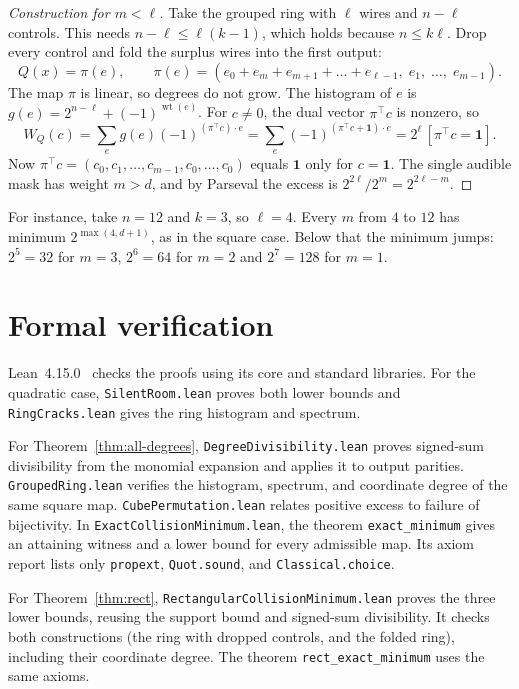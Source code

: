 \documentclass[11pt]{article}
\theoremstyle{definition}
\theoremstyle{remark}
\newcommand{\wt}{\operatorname{wt}}
\newcommand{\W}{W}
\newcommand{\one}{\mathbf{1}}
\begin{document}
\begin{proof}[Construction for $m<\ell$]
Take the grouped ring with $\ell$ wires and $n-\ell$ controls. This needs
$n-\ell\le\ell(k-1)$, which holds because $n\le k\ell$. Drop every control
and fold the surplus wires into the first output:
\[
  Q(x)=\pi(e),\qquad
  \pi(e)=(e_0+e_m+e_{m+1}+\dots+e_{\ell-1},\;e_1,\;\dots,\;e_{m-1}).
\]
The map $\pi$ is linear, so degrees do not grow. The histogram of $e$ is
$g(e)=2^{n-\ell}+(-1)^{\wt(e)}$. For $c\ne0$, the dual vector $\pi^{\top}c$
is nonzero, so
\[
  \W_Q(c)=\sum_e g(e)(-1)^{(\pi^{\top}c)\cdot e}
         =\sum_e(-1)^{(\pi^{\top}c+\one)\cdot e}
         =2^\ell\,[\pi^{\top}c=\one].
\]
Now $\pi^{\top}c=(c_0,c_1,\dots,c_{m-1},c_0,\dots,c_0)$ equals $\one$ only for
$c=\one$. The single audible mask has weight $m>d$, and by Parseval the excess
is $2^{2\ell}/2^m=2^{2\ell-m}$.
\end{proof}

For instance, take $n=12$ and $k=3$, so $\ell=4$. Every $m$ from $4$ to $12$
has minimum $2^{\max(4,d+1)}$, as in the square case. Below that the
minimum jumps: $2^5=32$ for $m=3$, $2^6=64$ for $m=2$ and $2^7=128$ for $m=1$.

\section{Formal verification}

Lean~4.15.0~\cite{Lean4} checks the proofs using its core and standard libraries.
For the quadratic case, \texttt{SilentRoom.lean} proves both lower bounds and
\texttt{RingCracks.lean} gives the ring histogram and spectrum.

For Theorem~\ref{thm:all-degrees}, \texttt{DegreeDivisibility.lean} proves
signed-sum divisibility from the monomial expansion and applies it to output
parities. \texttt{GroupedRing.lean} verifies the histogram, spectrum, and
coordinate degree of the same square map. \texttt{CubePermutation.lean}
relates positive excess to failure of bijectivity. In
\texttt{ExactCollisionMinimum.lean}, the theorem \texttt{exact\_minimum} gives
an attaining witness and a lower bound for every admissible map. Its axiom
report lists only \texttt{propext}, \texttt{Quot.sound}, and
\texttt{Classical.choice}.

For Theorem~\ref{thm:rect}, \texttt{RectangularCollisionMinimum.lean} proves
the three lower bounds, reusing the support bound and signed-sum divisibility.
It checks both constructions (the ring with dropped controls, and the folded
ring), including their coordinate degree. The theorem
\texttt{rect\_exact\_minimum} uses the same axioms.
\end{document}
